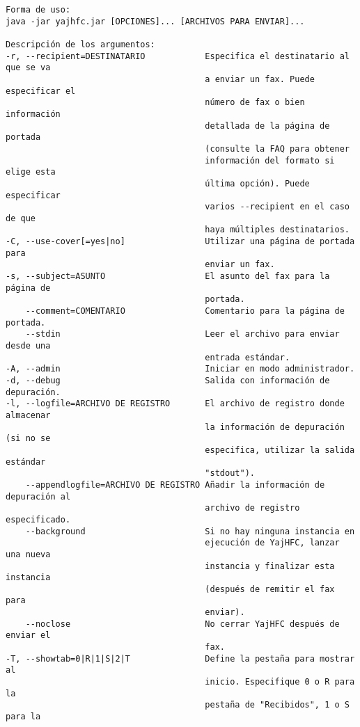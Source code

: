 \documentclass[a4paper,10pt]{scrartcl}
\begin{document}
\begin{verbatim}
Forma de uso:
java -jar yajhfc.jar [OPCIONES]... [ARCHIVOS PARA ENVIAR]...

Descripción de los argumentos:
-r, --recipient=DESTINATARIO            Especifica el destinatario al que se va
                                        a enviar un fax. Puede especificar el
                                        número de fax o bien información
                                        detallada de la página de portada
                                        (consulte la FAQ para obtener
                                        información del formato si elige esta
                                        última opción). Puede especificar
                                        varios --recipient en el caso de que
                                        haya múltiples destinatarios.
-C, --use-cover[=yes|no]                Utilizar una página de portada para
                                        enviar un fax.
-s, --subject=ASUNTO                    El asunto del fax para la página de
                                        portada.
    --comment=COMENTARIO                Comentario para la página de portada.
    --stdin                             Leer el archivo para enviar desde una
                                        entrada estándar.
-A, --admin                             Iniciar en modo administrador.
-d, --debug                             Salida con información de depuración.
-l, --logfile=ARCHIVO DE REGISTRO       El archivo de registro donde almacenar
                                        la información de depuración (si no se
                                        especifica, utilizar la salida estándar
                                        "stdout").
    --appendlogfile=ARCHIVO DE REGISTRO Añadir la información de depuración al
                                        archivo de registro especificado.
    --background                        Si no hay ninguna instancia en
                                        ejecución de YajHFC, lanzar una nueva
                                        instancia y finalizar esta instancia
                                        (después de remitir el fax para
                                        enviar).
    --noclose                           No cerrar YajHFC después de enviar el
                                        fax.
-T, --showtab=0|R|1|S|2|T               Define la pestaña para mostrar al
                                        inicio. Especifique 0 o R para la
                                        pestaña de "Recibidos", 1 o S para la

\end{verbatim}
\end{document}
